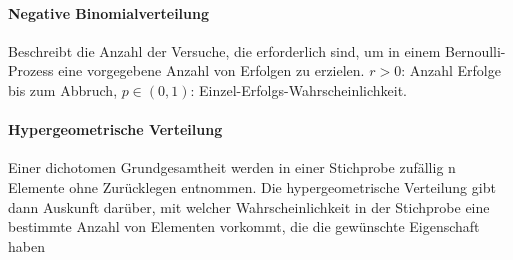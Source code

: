 \documentclass[12pt,landscape]{article}
\begin{document}
\begin{multicols}{3}
\paragraph{Negative Binomialverteilung} Beschreibt die Anzahl der Versuche, die erforderlich sind, um in einem Bernoulli-Prozess eine vorgegebene Anzahl von Erfolgen zu erzielen. $r > 0$: Anzahl Erfolge bis zum Abbruch, $p \in (0,1)$: Einzel-Erfolgs-Wahrscheinlichkeit.
\paragraph{Hypergeometrische Verteilung} Einer dichotomen Grundgesamtheit werden in einer Stichprobe zufällig n Elemente ohne Zurücklegen entnommen. Die hypergeometrische Verteilung gibt dann Auskunft darüber, mit welcher Wahrscheinlichkeit in der Stichprobe eine bestimmte Anzahl von Elementen vorkommt, die die gewünschte Eigenschaft haben

\end{multicols}
\end{document}
